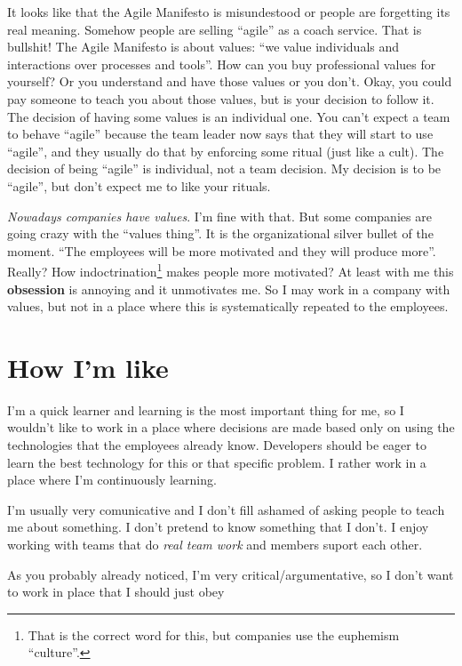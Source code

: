 \documentclass[11pt,a4paper,sans]{moderncv}
\begin{document}
It looks like that the Agile Manifesto is misundestood or people are
forgetting its real meaning. Somehow people are selling ``agile'' as a
coach service. That is bullshit! The Agile Manifesto is about values:
``we value individuals and interactions over processes and tools''.
How can you buy professional values for yourself? Or you understand
and have those values or you don't. Okay, you could pay someone to
teach you about those values, but is your decision to follow it. The
decision of having some values is an individual one. You can't expect
a team to behave ``agile'' because the team leader now says that they
will start to use ``agile'', and they usually do that by enforcing
some ritual (just like a cult).  The decision of being ``agile'' is
individual, not a team decision.  My decision is to be ``agile'', but
don't expect me to like your rituals.

\textit{Nowadays companies have values}. I'm fine with that. But some
companies are going crazy with the ``values thing''. It is the
organizational silver bullet of the moment. ``The employees will be
more motivated and they will produce more''.  Really? How
indoctrination\footnote{That is the correct word for this, but
  companies use the euphemism ``culture''.} makes people more
motivated? At least with me this \textbf{obsession} is annoying and it
unmotivates me.  So I may work in a company with values, but not in a
place where this is systematically repeated to the employees.

\section{How I'm like}
I'm a quick learner and learning is the most important thing for me,
so I wouldn't like to work in a place where decisions are made based
only on using the technologies that the employees already
know. Developers should be eager to learn the best technology for this or that
specific problem. I rather work in a place where I'm continuously learning.

I'm usually very comunicative and I don't fill ashamed of asking people
to teach me about something. I don't pretend to know something that I don't.
I enjoy working with teams that do \textit{real team work} and members
suport each other. 

As you probably already noticed, I'm very critical/argumentative, so
I don't want to work in place that I should just obey 
\end{document}
